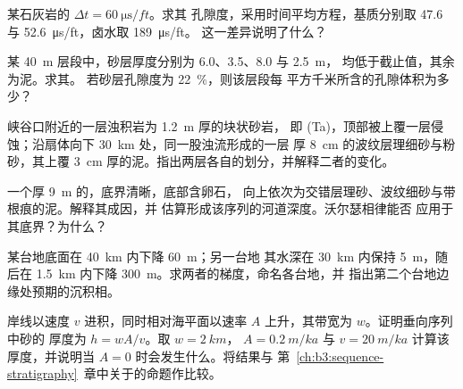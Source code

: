 \begin{exercise}[$\star\star$]\label{exo:b3:facies-models:5}
某石灰岩的 $\Delta t = \qty{60}{\micro\second/ft}$。求其
孔隙度，采用时间平均方程，基质分别取 47.6 与
\qty{52.6}{\micro\second/ft}，卤水取 \qty{189}{\micro\second/ft}。
这一差异说明了什么？
\end{exercise}

\begin{exercise}[$\star\star$]\label{exo:b3:facies-models:6}
某 \qty{40}{m} 层段中，砂层厚度分别为 6.0、3.5、8.0 与 \qty{2.5}{m}，
均低于截止值，其余为泥。求其。
若砂层孔隙度为 \qty{22}{\percent}，则该层段每
平方千米所含的孔隙体积为多少？
\end{exercise}

\begin{exercise}[$\star\star$]\label{exo:b3:facies-models:7}
峡谷口附近的一层浊积岩为 \qty{1.2}{m} 厚的块状砂岩，
即 (Ta)，顶部被上覆一层侵蚀；沿扇体向下 \qty{30}{km} 处，同一股浊流形成的一层
厚 \qty{8}{cm} 的波纹层理细砂与粉砂，其上覆
\qty{3}{cm} 厚的泥。指出两层各自的划分，并解释二者的变化。
\end{exercise}

\begin{exercise}[$\star\star$]\label{exo:b3:facies-models:8}
一个厚 \qty{9}{m} 的，底界清晰，底部含卵石，
向上依次为交错层理砂、波纹细砂与带根痕的泥。解释其成因，并
估算形成该序列的河道深度。沃尔瑟相律能否
应用于其底界？为什么？
\end{exercise}

\begin{exercise}[$\star\star$]\label{exo:b3:facies-models:9}
某台地底面在 \qty{40}{km} 内下降 \qty{60}{m}；另一台地
其水深在 \qty{30}{km} 内保持 \qty{5}{m}，随后在
\qty{1.5}{km} 内下降 \qty{300}{m}。求两者的梯度，命名各台地，并
指出第二个台地边缘处预期的沉积相。
\end{exercise}

\begin{exercise}[$\star\star\star$]\label{exo:b3:facies-models:10}
岸线以速度 $v$ 进积，同时相对海平面以速率
$A$ 上升，其带宽为 $w$。证明垂向序列中砂的
厚度为 $h = wA/v$。取 $w = \qty{2}{km}$，
$A = \qty{0.2}{m/ka}$ 与 $v = \qty{20}{m/ka}$ 计算该厚度，并说明当
$A = 0$ 时会发生什么。将结果与
第~\ref{ch:b3:sequence-stratigraphy}~章中关于的命题作比较。
\end{exercise}

